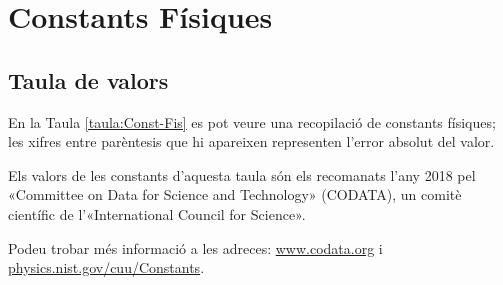 \chapter{Constants Físiques}\label{sec:const_fis} 

\section{Taula de valors}

En la Taula \vref{taula:Const-Fis} es pot veure una recopilació de
constants físiques; les xifres entre parèntesis que hi apareixen representen l'error absolut del valor.

Els valors de les constants d'aquesta taula són els recomanats
l'any 2018 pel «Committee on Data for Science and Technology»
(CODATA), un comitè científic de l'«International Council
for Science».

Podeu trobar  més informació a
les adreces: \href{http://www.codata.org/}{www.codata.org} i \href{http://physics.nist.gov/cuu/Constants/}{physics.nist.gov/cuu/Constants}.

